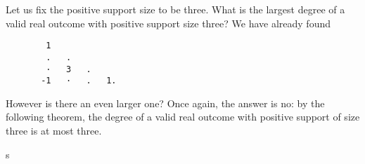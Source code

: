 \begin{example}
    Let us fix the positive support size to be three. What is the largest degree of a valid real outcome with positive support size three? We have already found
    \begin{verbatim}
        1  
        .   .     
        ·   3   .    
       -1   ·   .   1.   
    \end{verbatim} 
    However is there an even larger one? Once again, the answer is no: by the following theorem, the degree of a valid real outcome with positive support of size three is at most three.
 \end{example}

\begin{theorem}
    s
\end{theorem}